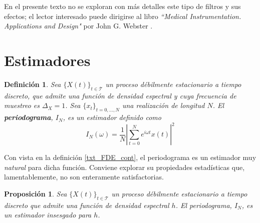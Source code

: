\documentclass[12pt,letterpaper]{book}
\newtheorem{definicion}{Definición}[chapter]
\newtheorem{proposicion}[teorema]{Proposición}
\newcommand{\E}[1]{\mathrm{E}\left[ #1 \right]}
\newcommand{\abso}[1]{\left| #1 \right|}
\newcommand{\xt}{$\{X(t)\}_{t\in \mathcal{T}}$ }
\newcommand{\xtd}{$\{x_t\}_{t=0,\dots,N}$ }
\begin{document}
En el presente texto no se exploran con más detalles este tipo de filtros y sus efectos; el lector interesado puede dirigirse al libro \textit{``Medical {I}nstrumentation. {A}pplications and {D}esign"} por John G. Webster \cite{Webster}.


\section{Estimadores}
\label{sec:estimadores}

%

\begin{definicion}
Sea \xt un proceso débilmente estacionario a tiempo discreto, que admite una función de densidad espectral y cuya frecuencia de muestreo es $\Delta_X=1$. Sea \xtd una realización de longitud $N$. 
%
El \textbf{periodograma}, $I_N$, es un estimador 
definido como
\begin{equation}
I_N(\omega) = \frac{1}{N} \abso{\sum_{t = 0}^{N} e^{i \omega t} x(t)}^{2}
\end{equation}
\label{txt_periodograma}
\end{definicion}

Con vista en la definición \ref{txt_FDE_cont}, el periodograma es un estimador muy \textit{natural} para dicha función.
%
Conviene explorar su propiedades estadísticas que, lamentablemente, no son enteramente satisfactorias.

\begin{proposicion}
Sea \xt un proceso débilmente estacionario a tiempo discreto que admite una función de densidad espectral $h$.
%
El periodograma, $I_N$, es un estimador insesgado para $h$.
\end{proposicion}
\end{document}
